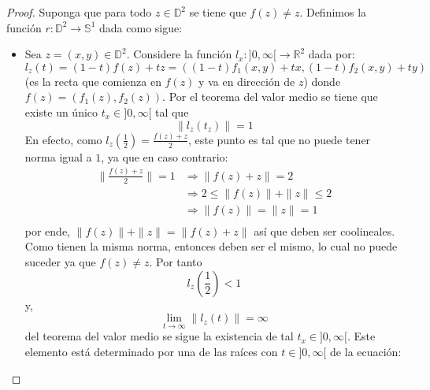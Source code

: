 \documentclass{article}
\newcounter{it}
\theoremstyle{largebreak}
\newcommand\cf[3]{\ensuremath{#1:#2\rightarrow#3}}
\begin{document}
    \begin{proof}
        Suponga que para todo $z\in\mathbb{D}^2$ se tiene que $f(z)\neq z$. Definimos la función $\cf{r}{\mathbb{D}^2}{\mathbb{S}^1}$ dada como sigue:

        \begin{itemize}
            \item Sea $z=(x,y)\in\mathbb{D}^2$. Considere la función $\cf{l_x}{]0,\infty[}{\mathbb{R}^2}$ dada por:
            \begin{equation*}
                l_z(t)=(1-t)f(z)+tz=((1-t)f_1(x,y)+tx,(1-t)f_2(x,y)+ty)
            \end{equation*}
            (es la recta que comienza en $f(z)$ y va en dirección de $z$) donde $f(z)=(f_1(z),f_2(z))$. Por el teorema del valor medio se tiene que existe un único $t_x\in]0,\infty[$ tal que
            \begin{equation*}
                \|l_z(t_z)\|=1
            \end{equation*}
            En efecto, como $l_z\left(\frac{1}{2}\right)=\frac{f(z)+z}{2}$, este punto es tal que no puede tener norma igual a $1$, ya que en caso contrario:
            \begin{equation*}
                \begin{split}
                    \|\frac{f(z)+z}{2}\|=1&\Rightarrow\|f(z)+z\|=2\\
                    &\Rightarrow2\leq\|f(z)\|+\|z\|\leq2 \\
                    &\Rightarrow\|f(z)\|=\|z\|=1 \\
                \end{split}
            \end{equation*}
            por ende, $\|f(z)\|+\|z\|=\|f(z)+z\|$ así que deben ser coolineales. Como tienen la misma norma, entonces deben ser el mismo, lo cual no puede suceder ya que $f(z)\neq z$. Por tanto
            \begin{equation*}
                l_z\left(\frac{1}{2}\right)<1
            \end{equation*}
            y,
            \begin{equation*}
                \lim_{  t\rightarrow\infty}\|l_z(t)\|=\infty
            \end{equation*}
            del teorema del valor medio se sigue la existencia de tal $t_x\in]0,\infty[$. Este elemento está determinado por una de las raíces con $t\in]0,\infty[$ de la ecuación:
            \begin{equation*}

\end{equation*}
\end{itemize}
\end{proof}
\end{document}
